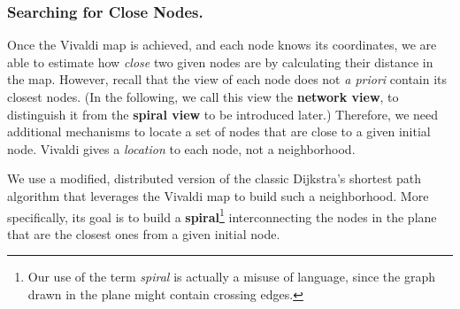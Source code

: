 

\subsubsection*{Searching for Close Nodes.}

Once the Vivaldi map is achieved, and each node knows its coordinates, we are
able to estimate how \emph{close} two given nodes are by calculating their
distance in the map. However, recall that the view of each node does not \emph{a
priori} contain its closest nodes. (In the following, we call this view the {\bf
network view}, to distinguish it from the {\bf spiral view} to be introduced
later.) Therefore, we need additional mechanisms to locate a set of nodes that
are close to a given initial node. Vivaldi gives a \emph{location} to each node,
not a neighborhood. 

We use a modified, distributed version of the classic Dijkstra's shortest path
algorithm that leverages the Vivaldi map to build such a neighborhood. More
specifically, its goal is to build a {\bf spiral}\footnote{Our use of the term
\emph{spiral} is actually a misuse of language, since the graph drawn in the
plane might contain crossing edges.} interconnecting the nodes in the plane that
are the closest ones from a given initial node.

